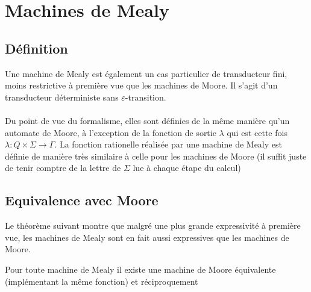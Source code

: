 \documentclass{scrartcl}
\begin{document}
\begin{flushleft}
\begin{figure}[h]
\begin{center}
\begin{tikzpicture}[auto, node distance = 1.5cm]
        \end{tikzpicture}
    \end{center}
\end{figure}

\vspace*{2cm}

\section{Machines de Mealy}

\subsection{Définition}

Une machine de Mealy est également un cas particulier de transducteur fini, moins restrictive à première vue que les machines de Moore.
Il s'agit d'un transducteur déterministe sans $\varepsilon$-transition.
\\~\\
Du point de vue du formalisme, elles sont définies de la même manière qu'un automate de Moore, à l'exception de la fonction de sortie
$\lambda$ qui est cette fois $\lambda : Q \times \Sigma \rightarrow \Gamma$. La fonction rationelle réalisée par une machine de Mealy
est définie de manière très similaire à celle pour les machines de Moore (il suffit juste de tenir comptre de la lettre de $\Sigma$ lue à chaque
étape du calcul)


\subsection{Equivalence avec Moore}

Le théorème suivant montre que malgré une plus grande expressivité à première vue, les machines de Mealy sont en fait aussi expressives que les machines
de Moore.

\begin{theorem}
    Pour toute machine de Mealy il existe une machine de Moore équivalente (implémentant la même fonction) et réciproquement
\end{theorem}


\end{flushleft}
\end{document}
